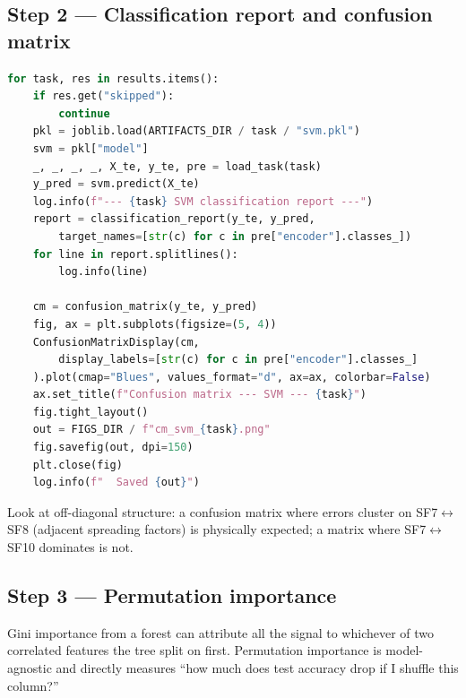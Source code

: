 \documentclass[11pt,letterpaper]{article}
\begin{document}
\subsection{Step 2 --- Classification report and confusion matrix}

\begin{lstlisting}[language=Python]
for task, res in results.items():
    if res.get("skipped"):
        continue
    pkl = joblib.load(ARTIFACTS_DIR / task / "svm.pkl")
    svm = pkl["model"]
    _, _, _, _, X_te, y_te, pre = load_task(task)
    y_pred = svm.predict(X_te)
    log.info(f"--- {task} SVM classification report ---")
    report = classification_report(y_te, y_pred,
        target_names=[str(c) for c in pre["encoder"].classes_])
    for line in report.splitlines():
        log.info(line)

    cm = confusion_matrix(y_te, y_pred)
    fig, ax = plt.subplots(figsize=(5, 4))
    ConfusionMatrixDisplay(cm,
        display_labels=[str(c) for c in pre["encoder"].classes_]
    ).plot(cmap="Blues", values_format="d", ax=ax, colorbar=False)
    ax.set_title(f"Confusion matrix --- SVM --- {task}")
    fig.tight_layout()
    out = FIGS_DIR / f"cm_svm_{task}.png"
    fig.savefig(out, dpi=150)
    plt.close(fig)
    log.info(f"  Saved {out}")
\end{lstlisting}

Look at off-diagonal structure: a confusion matrix where errors cluster on SF7$\leftrightarrow$SF8 (adjacent spreading factors) is physically expected; a matrix where SF7$\leftrightarrow$SF10 dominates is not.

\subsection{Step 3 --- Permutation importance}
Gini importance from a forest can attribute all the signal to whichever of two correlated features the tree split on first. Permutation importance is model-agnostic and directly measures ``how much does test accuracy drop if I shuffle this column?''
\end{document}
